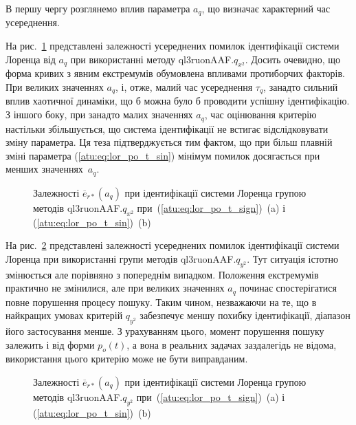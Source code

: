 В першу чергу розглянемо вплив параметра
$a_q$, що визначає характерний час усереднення.

На рис.~\ref{atu:f:lor_a_q_ql3ruonAAF.q_x2} представлені залежності усереднених
помилок ідентифікації системи Лоренца від
$a_q $ при використанні методу
ql3ruonAAF.$q_{x^2}$.
Досить очевидно, що форма кривих з явним екстремумів обумовлена
впливами протиборчих факторів. При великих значеннях
$a_q$, і, отже, малий час усереднення
$\tau_q $, занадто сильний вплив хаотичної динаміки, що б можна було
б проводити успішну ідентифікацію. З іншого боку, при занадто
малих значеннях
$a_q$, час оцінювання критерію настільки збільшується, що система
ідентифікації не встигає відслідковувати зміну параметра. Ця
теза підтверджується тим фактом, що при більш плавній зміні
параметра (\ref{atu:eq:lor_po_t_sin}) мінімум помилок досягається при
менших значеннях~$a_q$.

\begin{figure}[htb!]
  \caption{Залежності $ \overline{e}_{r *} (a_q) $ при ідентифікації системи Лоренца групою методів ql3ruonAAF.$q_{x^2} $ при~(\ref{atu:eq:lor_po_t_sign})~(a) і (\ref{atu:eq:lor_po_t_sin})~(b)}
  \label{atu:f:lor_a_q_ql3ruonAAF.q_x2}
\end{figure}


На рис.~\ref{atu:f:lor_a_q_ql3ruonAAF.q_y2} представлені залежності усереднених
помилок ідентифікації системи Лоренца при використанні групи методів ql3ruonAAF.$q_{y^2}$.
Тут ситуація істотно змінюється але порівняно з
попереднім випадком. Положення екстремумів практично не
змінилися, але при великих значеннях
$a_q$ починає спостерігатися повне порушення процесу
пошуку. Таким чином, незважаючи на те, що в найкращих умовах
критерій
$q_{y^2}$ забезпечує меншу похибку ідентифікації, діапазон його
застосування менше. З урахуванням цього, момент порушення пошуку
залежить і від форми
$p_o(t)$, а вона в реальних задачах заздалегідь не відома,
використання цього критерію може не бути виправданим.

\begin{figure}[htb!]
  \caption{Залежності $\overline{e}_{r *}(a_q)$ при ідентифікації системи Лоренца групою методів ql3ruonAAF.$q_{y^2}$ при~(\ref{atu:eq:lor_po_t_sign})~(a) і (\ref{atu:eq:lor_po_t_sin})~(b)}
  \label{atu:f:lor_a_q_ql3ruonAAF.q_y2}
\end{figure}


